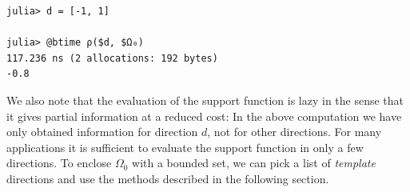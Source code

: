 \begin{minipage}{\linewidth}
	\begin{lstlisting}
julia> d = [-1, 1]

julia> @btime ρ($d, $Ω₀)
117.236 ns (2 allocations: 192 bytes)
-0.8
	\end{lstlisting}
\end{minipage}

\smallskip

We also note that the evaluation of the support function is lazy in the sense that it gives partial information at a reduced cost: In the above computation we have only obtained information for direction $d$, not for other directions. For many applications it is sufficient to evaluate the support function in only a few directions. To enclose $\Omega_0$ with a bounded set, we can pick a list of \emph{template} directions and use the methods described in the following section.
